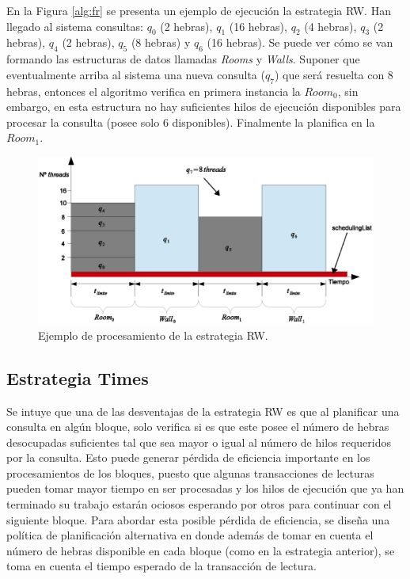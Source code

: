 En la Figura \ref{alg:fr} se presenta un ejemplo de ejecución la estrategia RW. Han llegado al sistema consultas: $q_{0}$ (2 hebras), $q_1$ (16 hebras), $q_2$ (4 hebras), $q_3$ (2 hebras), $q_4$ (2 hebras), $q_5$ (8 hebras) y $q_6$ (16 hebras). Se puede ver cómo se van formando las estructuras de datos llamadas \textit{Rooms} y \textit{Walls}. Suponer que eventualmente arriba al sistema una nueva consulta ($q_7$) que será resuelta con 8 hebras, entonces el algoritmo verifica en primera instancia la $Room_0$, sin embargo, en esta estructura no hay suficientes hilos de ejecución disponibles para procesar la consulta (posee solo 6 disponibles). Finalmente la planifica en la $Room_1$.

\begin{figure}[tp]
\centering
\includegraphics[scale=.75]{images/proceso_FR.eps}
\caption{Ejemplo de procesamiento de la estrategia RW.}
\label{fig:proceso_FR}
\end{figure} 

\subsection{Estrategia Times}
\label{scheduling:times}
Se intuye que una de las desventajas de la estrategia RW es que al planificar una consulta en algún bloque, solo verifica si es que este posee el número de hebras desocupadas suficientes tal que sea mayor o igual al número de hilos requeridos por la consulta. Esto puede generar pérdida de eficiencia importante en los procesamientos de los bloques, puesto que algunas transacciones de lecturas pueden tomar mayor tiempo en ser procesadas y los hilos de ejecución que ya han terminado su trabajo estarán ociosos esperando por otros para continuar con el siguiente bloque. Para abordar esta posible pérdida de eficiencia, se diseña una política de planificación alternativa en donde además de tomar en cuenta el número de hebras disponible en cada bloque (como en la estrategia anterior), se toma en cuenta el tiempo esperado de la transacción de lectura.

